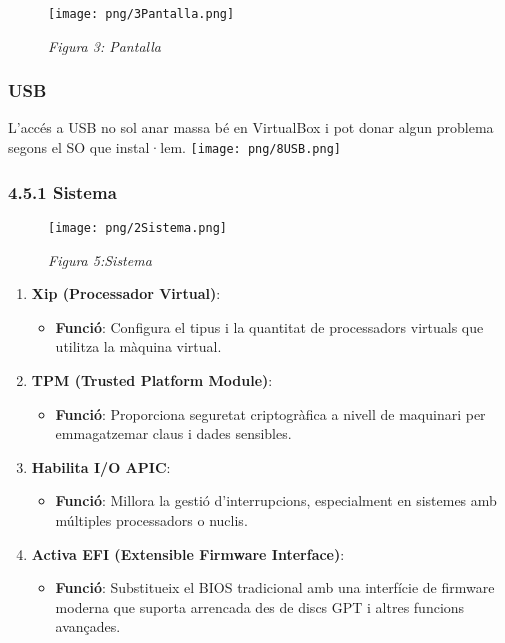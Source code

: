 \documentclass[
  12 pt,
  a4paper,
]{article}
\providecommand{\tightlist}{%
  \setlength{\itemsep}{0pt}\setlength{\parskip}{0pt}}
\begin{document}
\begin{figure}
\centering
\texttt{[image: png/3Pantalla.png]}
\caption{\emph{Figura 3: Pantalla}}
\end{figure}

\subsubsection{USB}\label{usb}

L'accés a USB no sol anar massa bé en VirtualBox i pot donar algun
problema segons el SO que instal·lem. \texttt{[image: png/8USB.png]}

\subsubsection{4.5.1 Sistema}\label{sistema}

\begin{figure}
\centering
\texttt{[image: png/2Sistema.png]}
\caption{\emph{Figura 5:Sistema}}
\end{figure}

\begin{enumerate}
\def\labelenumi{\arabic{enumi}.}
\tightlist
\item
  \textbf{Xip (Processador Virtual)}:

  \begin{itemize}
  \tightlist
  \item
    \textbf{Funció}: Configura el tipus i la quantitat de processadors
    virtuals que utilitza la màquina virtual.
  \end{itemize}
\item
  \textbf{TPM (Trusted Platform Module)}:

  \begin{itemize}
  \tightlist
  \item
    \textbf{Funció}: Proporciona seguretat criptogràfica a nivell de
    maquinari per emmagatzemar claus i dades sensibles.
  \end{itemize}
\item
  \textbf{Habilita I/O APIC}:

  \begin{itemize}
  \tightlist
  \item
    \textbf{Funció}: Millora la gestió d'interrupcions, especialment en
    sistemes amb múltiples processadors o nuclis.
  \end{itemize}
\item
  \textbf{Activa EFI (Extensible Firmware Interface)}:

  \begin{itemize}
  \tightlist
  \item
    \textbf{Funció}: Substitueix el BIOS tradicional amb una interfície
    de firmware moderna que suporta arrencada des de discs GPT i altres
    funcions avançades.
  \end{itemize}
\end{enumerate}
\end{document}

